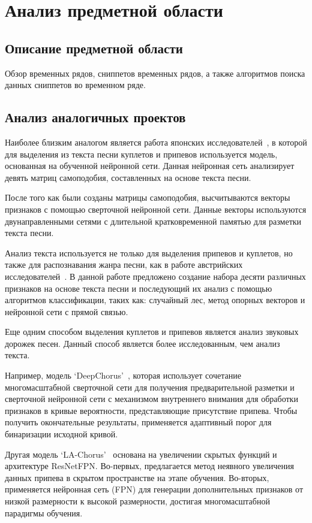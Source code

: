 \newpage
\section{Анализ предметной области}
\label{sec:Background}

\subsection{Описание предметной области}
Обзор временных рядов, сниппетов временных рядов, а также алгоритмов поиска данных сниппетов во временном ряде.
\vspace{2em}
\subsection{Анализ аналогичных проектов}
Наиболее близким аналогом является работа японских исследователей~\cite{WatanabeG20}, в которой для выделения из текста песни куплетов и припевов используется модель, основанная на обученной нейронной сети. Данная нейронная сеть анализирует девять матриц самоподобия, составленных на основе текста песни.

После того как были созданы матрицы самоподобия, высчитываются векторы признаков с помощью сверточной нейронной сети. Данные векторы используются двунаправленными сетями с длительной кратковременной памятью для разметки текста песни.

Анализ текста используется не только для выделения припевов и куплетов, но также для распознавания жанра песни, как в работе австрийских исследователей~\cite{Genre}. В данной работе предложено создание набора десяти различных признаков на основе текста песни и последующий их анализ с помощью алгоритмов классификации, таких как: случайный лес, метод опорных векторов и нейронной сети с прямой связью.

Еще одним способом выделения куплетов и припевов является анализ звуковых дорожек песен. Данный способ является более исследованным, чем анализ текста.

Например, модель `DeepChorus'~\cite{DeepChorus}, которая использует сочетание многомасштабной сверточной сети для получения предварительной разметки и сверточной нейронной сети с механизмом внутреннего внимания для обработки признаков в кривые вероятности, представляющие присутствие припева. Чтобы получить окончательные результаты, применяется адаптивный порог для бинаризации исходной кривой.

Другая модель `LA-Chorus'~\cite{LA-Chorus} основана на увеличении скрытых функций и архитектуре ResNetFPN. Во-первых, предлагается метод неявного увеличения данных припева в скрытом пространстве на этапе обучения. Во-вторых, применяется нейронная сеть (FPN) для генерации дополнительных признаков от низкой размерности к высокой размерности, достигая многомасштабной парадигмы обучения. 

